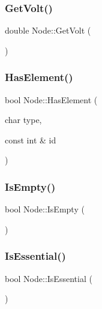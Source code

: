 \mbox{\label{class_node_a9745737f7d87d5f9602380e652f61546}} 
\subsubsection{\texorpdfstring{Get\+Volt()}{GetVolt()}}
{\footnotesize\ttfamily double Node\+::\+Get\+Volt (\begin{DoxyParamCaption}{ }\end{DoxyParamCaption})}

\mbox{\label{class_node_a463324063b042abc87cdb61f04798059}} 
\subsubsection{\texorpdfstring{Has\+Element()}{HasElement()}}
{\footnotesize\ttfamily bool Node\+::\+Has\+Element (\begin{DoxyParamCaption}\item[{char}]{type,  }\item[{const int \&}]{id }\end{DoxyParamCaption})}

\mbox{\label{class_node_a962fa54dc2c90850fe319785427c738a}} 
\subsubsection{\texorpdfstring{Is\+Empty()}{IsEmpty()}}
{\footnotesize\ttfamily bool Node\+::\+Is\+Empty (\begin{DoxyParamCaption}{ }\end{DoxyParamCaption})}

\mbox{\label{class_node_a8f845411f8d2d44530b72810341442ec}} 
\subsubsection{\texorpdfstring{Is\+Essential()}{IsEssential()}}
{\footnotesize\ttfamily bool Node\+::\+Is\+Essential (\begin{DoxyParamCaption}{ }\end{DoxyParamCaption})}

